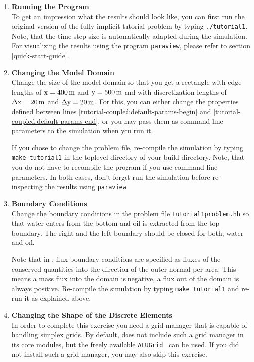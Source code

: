 \begin{enumerate}

\item \textbf{Running the Program} \\
  To get an impression what the results should look like, you can first run the original version of 
the fully-implicit tutorial problem by typing  \texttt{./tutorial1}. 
Note, that the time-step size is automatically adapted during the simulation. 
For visualizing the results using the program \texttt{paraview}, please refer to section \ref{quick-start-guide}.

\item \textbf{Changing the Model Domain} \\
  Change the size of the model domain so that you get a rectangle with
  edge lengths of $\text{x} = \unit[400]{m}$ and $\text{y} =
  \unit[500]{m}$ and with discretization lengths of $\Delta \text{x} =
  \unit[20]{m}$ and $\Delta \text{y} = \unit[20]{m}$. For this, you can
  either change the properties defined between lines
  \ref{tutorial-coupled:default-params-begin} and
  \ref{tutorial-coupled:default-params-end}, or you may pass them as
  command line parameters to the simulation when you run it.

  If you chose to change the problem file, re-compile the simulation
  by typing \texttt{make tutorial1} in the toplevel directory of your
  \eWoms build directory.  Note, that you do not have to recompile the
  program if you use command line parameters. In both cases, don't
  forget run the simulation before re-inspecting the results using
  \texttt{paraview}.
  
\item \textbf{Boundary Conditions} \\
  Change the boundary conditions in the problem file
  \texttt{tutorial1problem.hh} so that water enters from the
  bottom and oil is extracted from the top boundary. The right and the
  left boundary should be closed for both, water and oil. 

  Note that in \eWoms, flux boundary conditions are specified as
  fluxes of the conserved quantities into the direction of the outer
  normal per area. This means a mass flux into the domain is negative,
  a flux out of the domain is always positive. Re-compile the
  simulation by typing \texttt{make tutorial1} and re-run it
  as explained above.

\item \textbf{Changing the Shape of the Discrete Elements} \\
  In order to complete this exercise you need a \Dune grid manager
  that is capable of handling simplex grids. By default, \Dune does
  not include such a grid manager in its core modules, but the freely
  available \texttt{ALUGrid}~\cite{ALUGRID-HP} can be used. If you did
  not install such a grid manager, you may also skip this exercise.


\end{enumerate}
